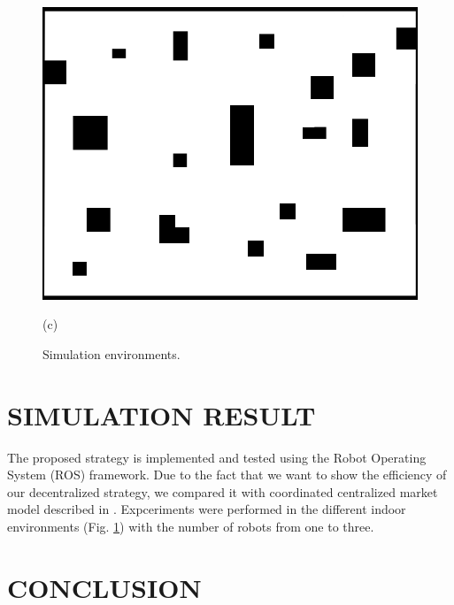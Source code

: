 \documentclass[letterpaper, 10 pt, conference]{ieeeconf}  %
\begin{document}
\begin{figure}[H]
\begin{minipage}{0.3\columnwidth}
		\includegraphics[width=\columnwidth]{unstructured.png}
		\caption{(c)}
		\label{fig:unstructured}
	\end{minipage}
 \caption{Simulation environments.}
 \label{fig:1}
\end{figure}

\section{SIMULATION RESULT}
The proposed strategy is implemented and tested using the Robot Operating System (ROS) framework.
Due to the fact that we want to show the efficiency of our decentralized strategy, we compared it with coordinated centralized market model described in \cite{burgard}. Expceriments were performed in the different indoor environments (Fig. \ref{fig:1}) with the number of robots from one to three. 

\newpage
\section{CONCLUSION}


\addtolength{\textheight}{-12cm}   %
\end{document}
